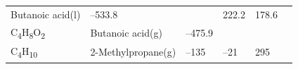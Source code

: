 \documentclass[
  9pt,
]{extbook}
\theoremstyle{definition}
\theoremstyle{definition}
\theoremstyle{definition}
\theoremstyle{remark}
\begin{document}
\begin{longtable}[]{@{}llllll@{}}
\begin{minipage}[t]{0.17\columnwidth}
Butanoic acid(l)\strut
\end{minipage} & \begin{minipage}[t]{0.15\columnwidth}\raggedright
--533.8\strut
\end{minipage} & \begin{minipage}[t]{0.15\columnwidth}\raggedright
\strut
\end{minipage} & \begin{minipage}[t]{0.14\columnwidth}\raggedright
222.2\strut
\end{minipage} & \begin{minipage}[t]{0.14\columnwidth}\raggedright
178.6\strut
\end{minipage}\tabularnewline
\begin{minipage}[t]{0.07\columnwidth}\raggedright
C\textsubscript{4}H\textsubscript{8}O\textsubscript{2}\strut
\end{minipage} & \begin{minipage}[t]{0.17\columnwidth}\raggedright
Butanoic acid(g)\strut
\end{minipage} & \begin{minipage}[t]{0.15\columnwidth}\raggedright
--475.9\strut
\end{minipage} & \begin{minipage}[t]{0.15\columnwidth}\raggedright
\strut
\end{minipage} & \begin{minipage}[t]{0.14\columnwidth}\raggedright
\strut
\end{minipage} & \begin{minipage}[t]{0.14\columnwidth}\raggedright
\strut
\end{minipage}\tabularnewline
\begin{minipage}[t]{0.07\columnwidth}\raggedright
C\textsubscript{4}H\textsubscript{10}\strut
\end{minipage} & \begin{minipage}[t]{0.17\columnwidth}\raggedright
2-Methylpropane(g)\strut
\end{minipage} & \begin{minipage}[t]{0.15\columnwidth}\raggedright
--135\strut
\end{minipage} & \begin{minipage}[t]{0.15\columnwidth}\raggedright
--21\strut
\end{minipage} & \begin{minipage}[t]{0.14\columnwidth}\raggedright
295\strut
\end{minipage} & \begin{minipage}[t]{0.14\columnwidth}\raggedright

\end{minipage}
\end{longtable}
\end{document}
